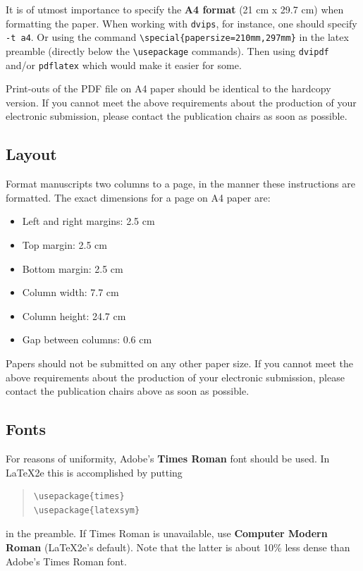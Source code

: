 \documentclass{article}
\begin{document}
It is of utmost importance to specify the \textbf{A4 format} (21 cm
x 29.7 cm) when formatting the paper. When working with
{\tt dvips}, for instance, one should specify {\tt -t a4}.
Or using the command \verb|\special{papersize=210mm,297mm}| in the latex
preamble (directly below the \verb|\usepackage| commands). Then using 
{\tt dvipdf} and/or {\tt pdflatex} which would make it easier for some.

Print-outs of the PDF file on A4 paper should be identical to the
hardcopy version. If you cannot meet the above requirements about the
production of your electronic submission, please contact the
publication chairs as soon as possible.

\subsection{Layout}
\label{ssec:layout}

Format manuscripts two columns to a page, in the manner these
instructions are formatted. The exact dimensions for a page on A4
paper are:

\begin{itemize}
\item Left and right margins: 2.5 cm
\item Top margin: 2.5 cm
\item Bottom margin: 2.5 cm
\item Column width: 7.7 cm
\item Column height: 24.7 cm
\item Gap between columns: 0.6 cm
\end{itemize}

\noindent Papers should not be submitted on any other paper size.
 If you cannot meet the above requirements about the production of 
 your electronic submission, please contact the publication chairs 
 above as soon as possible.

\subsection{Fonts}

For reasons of uniformity, Adobe's {\bf Times Roman} font should be
used. In \LaTeX2e{} this is accomplished by putting

\begin{quote}
\begin{verbatim}
\usepackage{times}
\usepackage{latexsym}
\end{verbatim}
\end{quote}
in the preamble. If Times Roman is unavailable, use {\bf Computer
  Modern Roman} (\LaTeX2e{}'s default).  Note that the latter is about
  10\% less dense than Adobe's Times Roman font.
\end{document}
